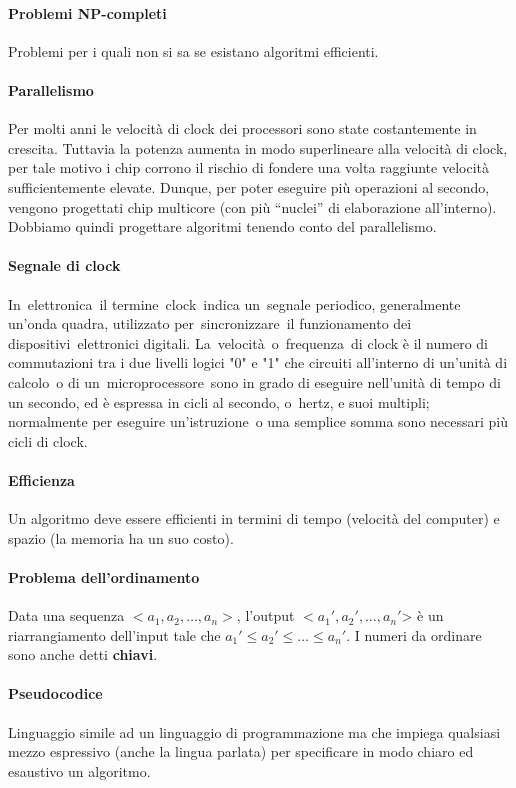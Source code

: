 \documentclass[11pt,a4paper]{article}
\begin{document}
\paragraph{Problemi NP-completi} Problemi per i quali non si sa se esistano algoritmi efficienti.

\paragraph{Parallelismo} Per molti anni le velocità di clock dei processori sono state costantemente in crescita. Tuttavia la potenza aumenta in modo superlineare alla velocità di clock, per tale motivo i chip corrono il rischio di fondere una volta raggiunte velocità sufficientemente elevate. Dunque, per poter eseguire più operazioni al secondo, vengono progettati chip multicore (con più “nuclei” di elaborazione all’interno). Dobbiamo quindi progettare algoritmi tenendo conto del parallelismo.

\paragraph{Segnale di clock} In elettronica il termine clock indica un segnale periodico, generalmente un'onda quadra, utilizzato per sincronizzare il funzionamento dei dispositivi elettronici digitali.
La velocità o frequenza di clock è il numero di commutazioni tra i due livelli logici "0" e "1" che circuiti all'interno di un'unità di calcolo o di un microprocessore sono in grado di eseguire nell'unità di tempo di un secondo, ed è espressa in cicli al secondo, o hertz, e suoi multipli; normalmente per eseguire un'istruzione o una semplice somma sono necessari più cicli di clock.

\paragraph{Efficienza} Un algoritmo deve essere efficienti in termini di tempo (velocità del computer) e spazio (la memoria ha un suo costo).

\paragraph{Problema dell’ordinamento} Data una sequenza $<a_1, a_2, …, a_n>$, l’output $<a_1', a_2', …, a_n'$> è un riarrangiamento dell’input tale che $a_1' \leq a_2' \leq … \leq a_n'$.
I numeri da ordinare sono anche detti \textbf{chiavi}.

\paragraph{Pseudocodice} Linguaggio simile ad un linguaggio di programmazione ma che impiega qualsiasi mezzo espressivo (anche la lingua parlata) per specificare in modo chiaro ed esaustivo un algoritmo.
\end{document}
